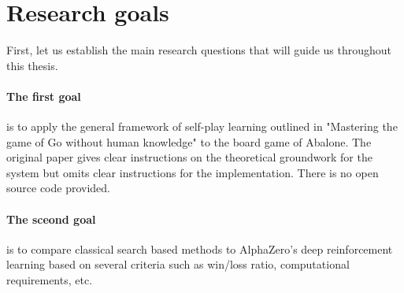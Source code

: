\section{Research goals}
First, let us establish the main research questions that will guide us throughout this thesis.

\paragraph{The first goal} is to apply the general framework of self-play learning outlined in "Mastering the game of Go without human knowledge" to the board game of Abalone. \cite{silver_mastering_2017} The original paper gives clear instructions on the theoretical groundwork for the system but omits clear instructions for the implementation. There is no open source code provided.

\paragraph{The sceond goal} is to compare classical search based methods to AlphaZero's deep reinforcement learning based on several criteria such as win/loss ratio, computational requirements, etc.

